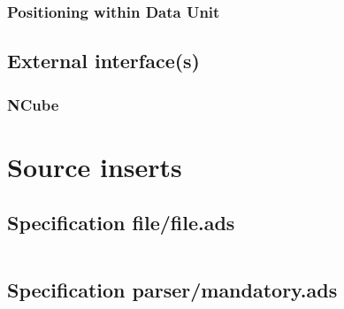 \documentclass[a4paper,10pt]{article}
\begin{document}
\subsubsection{Positioning within Data Unit}




\subsection{External interface(s)}
\subsubsection{NCube}







\section{Source inserts}


\subsection{Specification file/file.ads}
\inputminted[linenos, fontsize=\footnotesize]{ada}{../lib/src/file/file.ads}

\subsection{Specification parser/mandatory.ads}
\inputminted[linenos, fontsize=\footnotesize]{ada}{../lib/src/parser/mandatory.ads}


\end{document}
